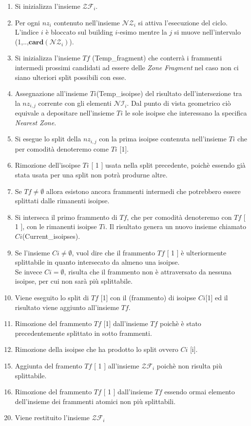 \begin{enumerate}
	\item Si inizializza l'insieme $\mathcal{ZF}_i$.
	\item Per ogni $nz_i$ contenuto nell'insieme $\mathcal{NZ}_i$ si attiva l'esecuzione del ciclo. L'indice $i$ è bloccato sul building $i$-esimo mentre la $j$ si muove nell'intervalo (1,..,$\mathbf{card}(\mathcal{NZ}_i)$).
	\item Si inizializza l'insieme $Tf$ (Temp\_fragment) che conterrà i frammenti intermedi prossimi candidati ad essere delle \textit{Zone Fragment} nel caso non ci siano ulteriori split possibili con esse.
	\item Assegnazione all'insieme $Ti$(Temp\_isoipse) del risultato dell'intersezione tra la $nz_{i,j}$ corrente con gli elementi $\mathcal{NI}_i$. Dal punto di vista geometrico ciò equivale a depositare nell'insieme $Ti$ le sole isoipse che interessano la specifica \textit{Nearest Zone}. 
	\item Si esegue lo split della $nz_{i,j}$ con la prima isoipse contenuta nell'insieme $Ti$ che per comodità denoteremo come $Ti$ [1].
	\item Rimozione dell'isoipse $Ti$ [ 1 ] usata nella split precedente, poichè essendo già stata usata per una split non potrà produrne altre.
	\item Se $Tf \not=\emptyset$ allora esistono ancora frammenti intermedi che potrebbero essere splittati dalle rimanenti isoipse.
	\item Si interseca il primo frammento di $Tf$, che per comodità denoteremo con $Tf$ [ 1 ], con le rimanenti isoipse $Ti$. Il risultato genera un nuovo insieme chiamato $Ci$(Current\_isoipses).
	\item Se l'insieme $Ci \not=\emptyset$, vuol dire che il frammento $Tf$ [ 1 ] è ulteriormente splittabile in quanto intersecato da almeno una isoipse.
	\\
	Se invece $Ci =\emptyset$, risulta che il frammento non è attraversato da nessuna isoipse, per cui non sarà più splittabile.
	\item Viene eseguito lo split di $Tf$ [1] con il (frammento) di isoipse $Ci$[1] ed il risultato viene aggiunto all'insieme $Tf$.
	\item Rimozione del frammento $Tf$ [1] dall'insieme $Tf$ poichè è stato precedentemente splittato in sotto frammenti.
	\item Rimozione della isoipse che ha prodotto lo split ovvero $Ci$ [i].
\end{enumerate}
\begin{enumerate}
	\setcounter{enumi}{14}
	\item Aggiunta del framento $Tf$ [ 1 ] all'insieme $\mathcal{ZF}_i$  poichè non risulta più splittabile.
	\item Rimozione del frammento $Tf$ [ 1 ] dall'insieme $Tf$ essendo ormai elemento dell'insieme dei frammenti atomici non più splittabili.
\end{enumerate}
\begin{enumerate}
		\setcounter{enumi}{19}
		\item Viene restituito l'insieme $\mathcal{ZF}_i$
\end{enumerate}

